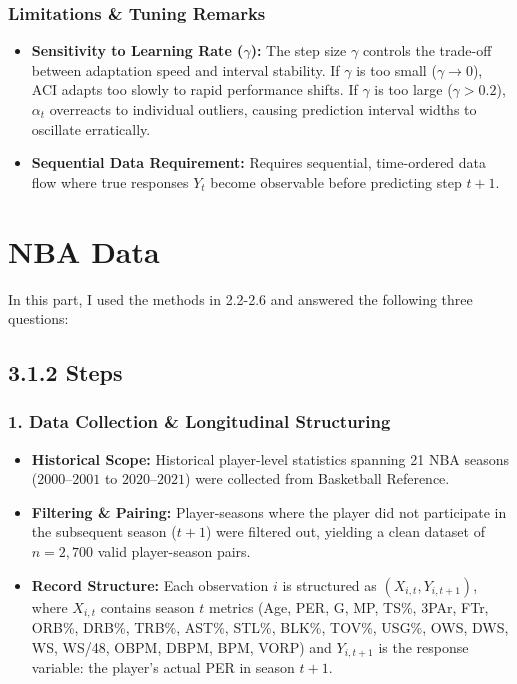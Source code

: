 \documentclass[11pt,a4paper]{article}
\begin{document}
\subsubsection{Limitations \& Tuning Remarks}
\begin{itemize}
    \item \textbf{Sensitivity to Learning Rate ($\gamma$):} The step size $\gamma$ controls the trade-off between adaptation speed and interval stability. If $\gamma$ is too small ($\gamma \to 0$), ACI adapts too slowly to rapid performance shifts. If $\gamma$ is too large ($\gamma > 0.2$), $\alpha_t$ overreacts to individual outliers, causing prediction interval widths to oscillate erratically.
    \item \textbf{Sequential Data Requirement:} Requires sequential, time-ordered data flow where true responses $Y_t$ become observable before predicting step $t+1$.
\end{itemize}

\section{NBA Data}
In this part, I used the methods in 2.2-2.6 and answered the following three questions:

\subsection{3.1.2 Steps}

\subsubsection{1. Data Collection \& Longitudinal Structuring}
\begin{itemize}
    \item \textbf{Historical Scope:} Historical player-level statistics spanning 21 NBA seasons ($2000$--$2001$ to $2020$--$2021$) were collected from Basketball Reference.
    \item \textbf{Filtering \& Pairing:} Player-seasons where the player did not participate in the subsequent season ($t+1$) were filtered out, yielding a clean dataset of $n = 2,700$ valid player-season pairs.
    \item \textbf{Record Structure:} Each observation $i$ is structured as $(X_{i,t}, Y_{i,t+1})$, where $X_{i,t}$ contains season $t$ metrics (Age, PER, G, MP, TS\%, 3PAr, FTr, ORB\%, DRB\%, TRB\%, AST\%, STL\%, BLK\%, TOV\%, USG\%, OWS, DWS, WS, WS/48, OBPM, DBPM, BPM, VORP) and $Y_{i,t+1}$ is the response variable: the player's actual PER in season $t+1$.
\end{itemize}
\end{document}
